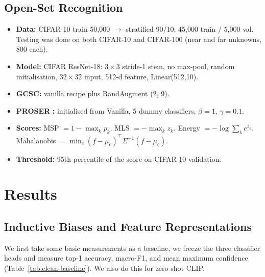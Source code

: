 \documentclass{article}
\newenvironment{tight}{\begin{itemize}\setlength{\itemsep}{0pt}\setlength{\parsep}{0pt}\setlength{\topsep}{2pt}\setlength{\parskip}{0pt}}{\end{itemize}}
\begin{document}
\subsection{Open-Set Recognition}
\begin{tight}
  \item \textbf{Data:} CIFAR-10 train 50,000 $\to$ stratified 90/10: 45,000 train / 5,000 val. Testing was done on both CIFAR-10 and CIFAR-100 (near and far unknowns, 800 each).
  \item \textbf{Model:} CIFAR ResNet-18: $3\times3$ stride-1 stem, no max-pool, random initialisation, $32\times32$ input, 512-d feature, Linear(512,10).
  \item \textbf{GCSC:} vanilla recipe plus RandAugment (2, 9).
  \item \textbf{PROSER} \citep{zhou2021proser}\textbf{:} initialised from Vanilla, 5 dummy classifiers, $\beta=1$, $\gamma=0.1$.
  \item \textbf{Scores:} MSP \citep{hendrycks2017msp} $=1-\max_k p_k$. MLS \citep{vaze2022osr} $=-\max_k z_k$. Energy \citep{liu2020energy} $=-\log\sum_k e^{z_k}$. Mahalanobis $=\min_c (f-\mu_c)^{\top}\Sigma^{-1}(f-\mu_c)$.
  \item \textbf{Threshold:} 95th percentile of the score on CIFAR-10 validation.
\end{tight}


\section{Results}
\label{sec:results}

\subsection{Inductive Biases and Feature Representations}

We first take some basic measurements as a baseline, we freeze the three classifier heads and measure top-1 accuracy,
macro-F1, and mean maximum confidence (Table~\ref{tab:clean-baseline}). We also do this for zero shot CLIP.
\end{document}
